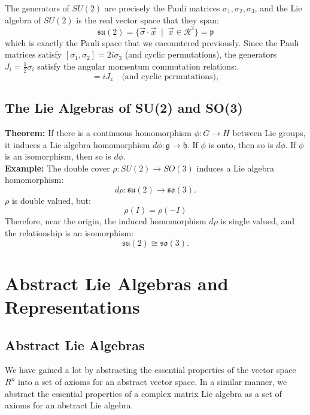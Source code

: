 \documentclass[12pt]{article}
\begin{document}
The generators of $SU(2)$ are precisely the Pauli matrices $\sigma_1,
\sigma_2, \sigma_3$, and the Lie algebra of $SU(2)$ is the real vector
space that they span:
\begin{equation*}
  \mathfrak{su}(2) = \{\vec{\sigma} \cdot \vec{x} \; \mid \; \vec{x} \in \mathcal{R}^3\}
  = \mathfrak{p}
\end{equation*}
which is exactly the Pauli space that we encountered previously.
Since the Pauli matrices satisfy $[\sigma_1, \sigma_2] = 2i\sigma_3$
(and cyclic permutations), the generators $J_i = \frac{1}{2}\sigma_i$
satisfy the angular momentum commutation relations:
\begin{equation*}
  [J_x, J_y] = iJ_z \quad \text{(and cyclic permutations)},
\end{equation*}


\subsection*{The Lie Algebras of SU(2) and SO(3)}

\noindent\textbf{Theorem:} If there is a continuous homomorphism $\phi: G \to
H$ between Lie groups, it induces a Lie algebra homomorphism $d\phi:
\mathfrak{g} \to \mathfrak{h}$.  If $\phi$ is onto, then so is $d\phi$.
If $\phi$ is an isomorphism, then so is $d\phi$.\\[5pt]

\noindent\textbf{Example:} The double cover $\rho: SU(2) \to SO(3)$
induces a Lie algebra homomorphism:
$$d\rho: \mathfrak{su}(2) \to \mathfrak{so}(3).$$
$\rho$ is double valued, but:
$$\rho(I)=\rho(-I)$$
Therefore, near the origin, the induced homomorphism $d\rho$ is single valued, and the
relationship is an isomorphism:
\begin{equation*}
  \mathfrak{su}(2) \cong \mathfrak{so}(3).
\end{equation*}

\section{Abstract Lie Algebras and Representations}

\subsection*{Abstract Lie Algebras}

We have gained a lot by abstracting the essential properties of the vector
space $R^n$ into a set of axioms for an abstract vector space.  In a
similar manner, we abstract the essential properties of a complex matrix Lie
algebra as a set of axioms for an abstract Lie algebra.\\[5pt]
\end{document}
